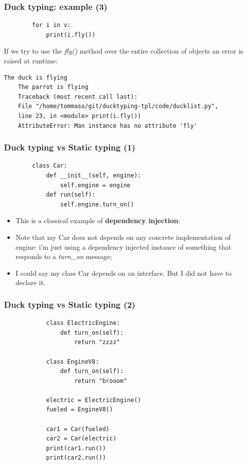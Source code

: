 \documentclass[xcolor ={table,usenames,dvipsnames}]{beamer}
\theoremstyle{definition}
\begin{document}
	\begin{frame}[fragile]
		\frametitle{Duck typing: example (3)}
		\begin{lstlisting}	
		for i in v:
			print(i.fly())
		\end{lstlisting}
		If we try to use the \textit{fly()} method  over the entire collection of objects an error is raised at runtime:
			\begin{lstlisting}[keywordstyle=\color{black},
		commentstyle=\color{black},
	stringstyle=\color{black}.]	
	The duck is flying
	The parrot is flying
	Traceback (most recent call last):
	File "/home/tommaso/git/ducktyping-tpl/code/ducklist.py", 
	line 23, in <module> print(i.fly())
	AttributeError: Man instance has no attribute 'fly'
		\end{lstlisting}
	\end{frame}

	\begin{frame}[fragile]
		\frametitle{Duck typing vs Static typing (1)}
		\begin{lstlisting}
		class Car:
			def __init__(self, engine):
				self.engine = engine
			def run(self):
				self.engine.turn_on()			
		\end{lstlisting}
		
		\begin{itemize}
			\item This is a classical example of \textbf{dependency injection};
			\item Note that my Car does not depends on any concrete implementation of engine: i'm just using a dependency injected instance of something that responds to a \textit{turn\_on} message;
			\item I could say my class Car depends on an interface. But I did not have to declare it. %
		\end{itemize}	
	\end{frame}
	
	\begin{frame}[fragile]
		\frametitle{Duck typing vs Static typing (2)}
		\begin{lstlisting}
			class ElectricEngine:
				def turn_on(self):
					return "zzzz"
			
			class EngineV8:
				def turn_on(self):
					return "brooom"
			
			electric = ElectricEngine()
			fueled = EngineV8()
			
			car1 = Car(fueled)
			car2 = Car(electric)
			print(car1.run())
			print(car2.run())
		\end{lstlisting}
	\end{frame}
	
\end{document}
